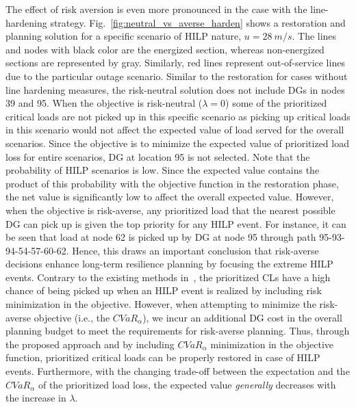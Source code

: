The effect of risk aversion is even more pronounced in the case with the line-hardening strategy. Fig.~\ref{fig:neutral_vs_averse_harden} shows a restoration and planning solution for a specific scenario of HILP nature, $u = 28~m/s$. The lines and nodes with black color are the energized section, whereas non-energized sections are represented by gray. Similarly, red lines represent out-of-service lines due to the particular outage scenario.
Similar to the restoration for cases without line hardening measures, the risk-neutral solution does not include DGs in nodes 39 and 95. When the objective is risk-neutral ($\lambda=0$) some of the prioritized critical loads are not picked up in this specific scenario as picking up critical loads in this scenario would not affect the expected value of load served for the overall scenarios. Since the objective is to minimize the expected value of prioritized load loss for entire scenarios, DG at location 95 is not selected. Note that the probability of HILP scenarios is low. Since the expected value contains the product of this probability with the objective function in the restoration phase, the net value is significantly low to affect the overall expected value. However, when the objective is risk-averse, any prioritized load that the nearest possible DG can pick up is given the top priority for any HILP event. For instance, it can be seen that load at node 62 is picked up by DG at node 95 through path 95-93-94-54-57-60-62.
Hence, this draws an important conclusion that risk-averse decisions enhance long-term resilience planning by focusing the extreme HILP events. Contrary to the existing methods in~\cite{8329529, 2021IASTATE, 9136725}, the prioritized CLs have a high chance of being picked up when an HILP event is realized by including risk minimization in the objective. However, when attempting to minimize the risk-averse objective (i.e., the $CVaR_\alpha$), we incur an additional DG cost in the overall planning budget to meet the requirements for risk-averse planning. Thus, through the proposed approach and by including $CVaR_\alpha$ minimization in the objective function, prioritized critical loads can be properly restored in case of HILP events. Furthermore, with the changing trade-off between the expectation and the $CVaR_\alpha$ of the prioritized load loss, the expected value \textit{generally} decreases with the increase in $\lambda$. 

